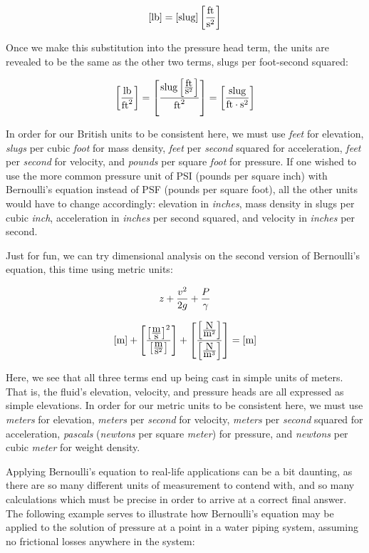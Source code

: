 $$[\hbox{lb}] = [\hbox{slug}] \left[\hbox{ft} \over \hbox{s}^2\right]$$

Once we make this substitution into the pressure head term, the units are revealed to be the same as the other two terms, slugs per foot-second squared:

$$\left[\hbox{lb} \over  \hbox{ft}^2\right] = \left[\hbox{slug} \left[\hbox{ft} \over \hbox{s}^2\right] \over  \hbox{ft}^2\right] = \left[\hbox{slug} \over \hbox{ft} \cdot \hbox{s}^2 \right]$$

In order for our British units to be consistent here, we must use \textit{feet} for elevation, \textit{slugs} per cubic \textit{foot} for mass density, \textit{feet} per \textit{second} squared for acceleration, \textit{feet} per \textit{second} for velocity, and \textit{pounds} per square \textit{foot} for pressure.  If one wished to use the more common pressure unit of PSI (pounds per square inch) with Bernoulli's equation instead of PSF (pounds per square foot), all the other units would have to change accordingly: elevation in \textit{inches}, mass density in slugs per cubic \textit{inch}, acceleration in \textit{inches} per second squared, and velocity in \textit{inches} per second. 

Just for fun, we can try dimensional analysis on the second version of Bernoulli's equation, this time using metric units:

$$z + {v^2 \over {2 g}} + {P \over \gamma}$$

$$[\hbox{m}] + \left[\left[\hbox{m} \over \hbox{s}\right]^2 \over \left[\hbox{m} \over \hbox{s}^2\right]\right] + \left[\left[\hbox{N} \over \hbox{m}^2 \right] \over \left[\hbox{N} \over \hbox{m}^3\right] \right] = [\hbox{m}]$$

Here, we see that all three terms end up being cast in simple units of meters.  That is, the fluid's elevation, velocity, and pressure heads are all expressed as simple elevations.  In order for our metric units to be consistent here, we must use \textit{meters} for elevation, \textit{meters} per \textit{second} for velocity, \textit{meters} per \textit{second} squared for acceleration, \textit{pascals} (\textit{newtons} per square \textit{meter}) for pressure, and \textit{newtons} per cubic \textit{meter} for weight density.

\vskip 10pt

Applying Bernoulli's equation to real-life applications can be a bit daunting, as there are so many different units of measurement to contend with, and so many calculations which must be precise in order to arrive at a correct final answer.  The following example serves to illustrate how Bernoulli's equation may be applied to the solution of pressure at a point in a water piping system, assuming no frictional losses anywhere in the system:

